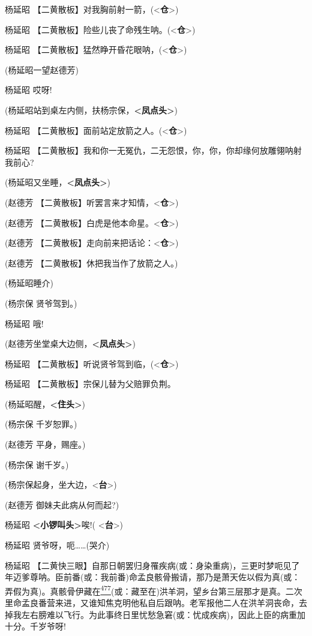 杨延昭
【二黄散板】对我胸前射一箭，(\textless{}\textbf{仓}\textgreater{})

杨延昭
【二黄散板】险些儿丧了命残生呐。(\textless{}\textbf{仓}\textgreater{})

杨延昭
【二黄散板】猛然睁开昏花眼呐，(\textless{}\textbf{仓}\textgreater{})

(杨延昭一望赵德芳)

杨延昭 哎呀!

(杨延昭站到桌左内侧，扶杨宗保，\textbf{\textless{}凤点头\textgreater{}})

杨延昭
【二黄散板】面前站定放箭之人。(\textless{}\textbf{仓}\textgreater{})

杨延昭
【二黄散板】我和你一无冤仇，二无怨恨，你，你，你却缘何放雕翎呐射我前心?

(杨延昭又坐睡，\textbf{\textless{}凤点头\textgreater{}})

(赵德芳
【二黄散板】听罢言来才知情，\textless{}\textbf{仓}\textgreater{})

(赵德芳
【二黄散板】白虎是他本命星。\textless{}\textbf{仓}\textgreater{})

(赵德芳
【二黄散板】走向前来把话论：\textless{}\textbf{仓}\textgreater{})

(赵德芳 【二黄散板】休把我当作了放箭之人。)

(杨延昭睡介)

(杨宗保 贤爷驾到。)

杨延昭 哦!

(赵德芳坐堂桌大边侧，\textbf{\textless{}凤点头\textgreater{}})

杨延昭
【二黄散板】听说贤爷驾到临，(\textless{}\textbf{仓}\textgreater{})

杨延昭 【二黄散板】宗保儿替为父赔罪负荆。

(杨延昭醒，\textbf{\textless{}住头\textgreater{}})

(杨宗保 千岁恕罪。)

(赵德芳 平身，赐座。)

(杨宗保 谢千岁。)

(杨宗保起身，坐大边，\textless{}\textbf{台}\textgreater{})

(赵德芳 御妹夫此病从何而起?)

杨延昭 \textbf{\textless{}小锣叫头\textgreater{}}唉!(
\textless{}\textbf{台}\textgreater{})

杨延昭 贤爷呀，呃\ldots{}\ldots{}(哭介)

杨延昭
【二黄快三眼】自那日朝罢归身罹疾病(或：身染重病)，三更时梦呃见了年迈爹尊呐。臣前番(或：我前番)命孟良骸骨搬请，那乃是萧天佐以假为真(或：弄假为真)。真骸骨伊藏在\protect\hyperlink{fn477}{\textsuperscript{477}}(或：藏至在)洪羊洞，望乡台第三层那才是真。二次里命孟良番营来进，又谁知焦克明他私自后跟呐。老军报他二人在洪羊洞丧命，去掉我左右膀难以飞行。为此事终日里忧愁急窘(或：忧成疾病)，因此上臣的病重加十分。千岁爷呀!

